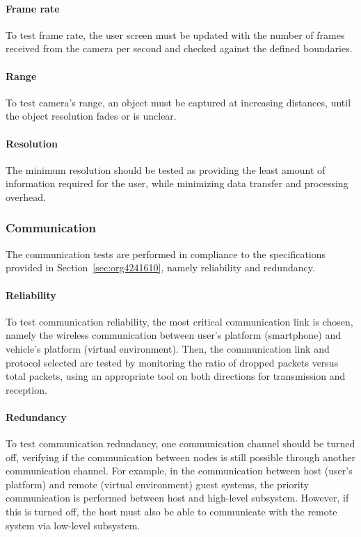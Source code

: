 \paragraph{Frame rate}%
\label{sec:frame-rate-test}
To test frame rate, the user screen must be updated with the number of frames
received from the camera per second and checked against the defined boundaries.

\paragraph{Range}%
\label{sec:range-test}
To test camera's range, an object must be captured at increasing distances,
until the object resolution fades or is unclear.

\paragraph{Resolution}%
\label{sec:resolution-test}
The minimum resolution should be tested as providing the least amount of
information required for the user, while minimizing data transfer and processing overhead.

\subsubsection{Communication}%
\label{sec:comm-tests}
The communication tests are performed in compliance to the specifications
provided in Section~\ref{sec:org4241610}, namely reliability and redundancy.

\paragraph{Reliability}%
\label{sec:comm-reliability-test}
To test communication reliability, the most critical communication link is
chosen, namely the wireless communication between user's platform (smartphone)
and vehicle's platform (virtual environment). Then, the communication link and
protocol selected are tested by monitoring the ratio of dropped packets versus
total packets, using an appropriate tool on both directions for transmission and reception.

\paragraph{Redundancy}%
\label{sec:redundancy-test}
To test communication redundancy, one communication channel should be turned
off, verifying if the communication between nodes is still possible through
another communication channel. For example, in the communication between host
(user's platform) and remote (virtual environment) guest systems, the priority
communication is performed between host and high-level subsystem. However, if
this is turned off, the host must also be able to communicate with the remote
system via low-level subsystem.

